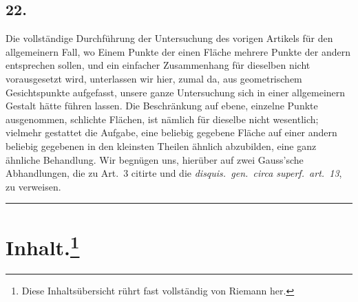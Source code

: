 \documentclass[12pt,a4paper]{book}
\theoremstyle{definition}
\theoremstyle{remark}
\begin{document}
\subsection*{22.}

Die vollständige Durchführung der Untersuchung des vorigen Artikels für den allgemeinern Fall, wo Einem Punkte der einen Fläche mehrere Punkte der andern entsprechen sollen, und ein einfacher Zusammenhang für dieselben nicht vorausgesetzt wird, unterlassen wir hier, zumal da, aus geometrischem Gesichtspunkte aufgefasst, unsere ganze Untersuchung sich in einer allgemeinern Gestalt hätte führen lassen. Die Beschränkung auf ebene, einzelne Punkte ausgenommen, schlichte Flächen, ist nämlich für dieselbe nicht wesentlich; vielmehr gestattet die Aufgabe, eine beliebig gegebene Fläche auf einer andern beliebig gegebenen in den kleinsten Theilen ähnlich abzubilden, eine ganz ähnliche Behandlung. Wir begnügen uns, hierüber auf zwei Gauss'sche Abhandlungen, die zu Art.~3 citirte und die \textit{disquis.\ gen.\ circa superf.\ art.~13}, zu verweisen.

\bigskip
\begin{center}
\rule{0.5\textwidth}{0.4pt}
\end{center}

\vspace{1em}

\section*{Inhalt.\footnote{Diese Inhaltsübersicht rührt fast vollständig von Riemann her.}}
\end{document}
